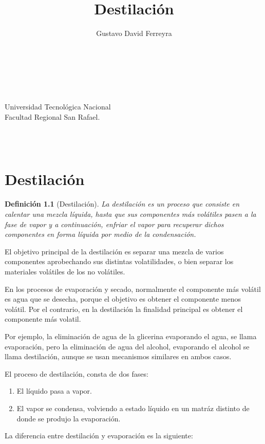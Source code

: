 \documentclass[11pt,openany]{book}
\title{Destilación}
\author{Gustavo David Ferreyra}
\newtheorem{defi}{Definición}
\begin{document}
\makeatletter
\begin{titlepage}
\centering
 \\
\vspace{1cm}
\begin{Huge}
\@title \\ 
\end{Huge}
\vspace{1cm}
\begin{large}
Universidad Tecnológica Nacional \\ 
  Facultad Regional San Rafael.
\end{large}

\vspace{5cm}

\@author \\
\@date \\


\end{titlepage}


\chapter{Destilación}
\begin{defi}[Destilación]
La destilación es un proceso que consiste en calentar una mezcla líquida, hasta que sus componentes más 
volátiles pasen a la fase de vapor y a continuación, enfriar el vapor para recuperar dichos 
componentes en forma líquida por medio de la condensación.
\end{defi}

El objetivo principal de la destilación es separar una mezcla de varios componentes aprobechando 
sus distintas volatilidades, o bien separar los materiales volátiles de los no volátiles.

En los procesos de evaporación y secado, normalmente el componente más volátil es agua que se desecha, porque el objetivo es obtener 
el componente menos volátil. Por el contrario, en la destilación la finalidad principal es obtener el componente más volatil.

Por ejemplo, la eliminación de agua de la glicerina evaporando el agua, se llama evaporación, pero 
la eliminación de agua del alcohol, evaporando el alcohol se llama destilación, aunque se usan 
mecanismos similares en ambos casos.

El proceso de destilación, consta de dos fases:
\begin{enumerate}
\item El líquido pasa a vapor. 
\item El vapor se condensa, volviendo a estado líquido en un matráz distinto de donde se produjo la evaporación.
\end{enumerate}
La diferencia entre destilación y evaporación es la siguiente:
\end{document}

